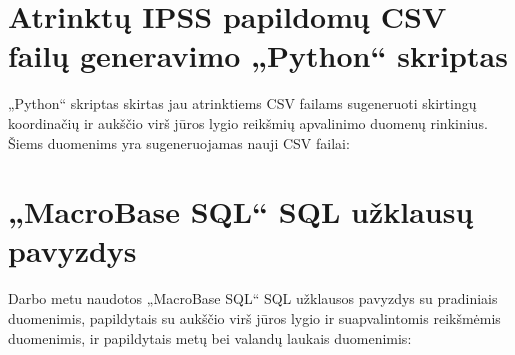 \documentclass{VUMIFPSbakalaurinis}
\begin{document}
\section{Atrinktų IPSS papildomų CSV failų generavimo „Python“ skriptas} \label{script4}
„Python“ skriptas skirtas jau atrinktiems CSV failams sugeneruoti skirtingų koordinačių ir aukščio virš jūros lygio reikšmių apvalinimo duomenų rinkinius. Šiems duomenims yra sugeneruojamas nauji CSV failai:


\section{„MacroBase SQL“ SQL užklausų pavyzdys} \label{script4}
Darbo metu naudotos „MacroBase SQL“ SQL užklausos pavyzdys su pradiniais duomenimis, papildytais su aukščio virš jūros lygio ir suapvalintomis reikšmėmis duomenimis, ir papildytais metų bei valandų laukais duomenimis:

\end{document}

